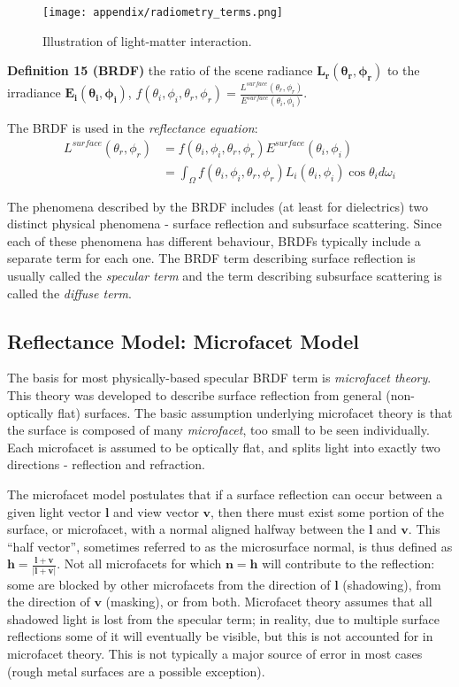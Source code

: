 \begin{figure}[!htbp]
\centering
\texttt{[image: appendix/radiometry\_terms.png]}
\caption{Illustration of light-matter interaction.}
\label{fig:radiometry_terms}
\end{figure}

\noindent\textbf{Definition 15 (BRDF)} the ratio of the scene radiance $\mathbf{L_r(\theta_r, \phi_r)}$ to the irradiance $\mathbf{E_i(\theta_i, \phi_i)}$, \ie $f(\theta_i, \phi_i, \theta_r, \phi_r)=\frac{L^{surface}(\theta_r, \phi_r)}{E^{surface}(\theta_i, \phi_i)}$.

The BRDF is used in the \textit{reflectance equation}:
\begin{align*}
L^{surface}(\theta_r, \phi_r)&=f(\theta_i, \phi_i, \theta_r, \phi_r)E^{surface}(\theta_i, \phi_i)\\
&= \int_\Omega f(\theta_i, \phi_i, \theta_r, \phi_r) L_i(\theta_i, \phi_i) \cos\theta_i d\omega_i
\end{align*}

The phenomena described by the BRDF includes (at least for dielectrics) two distinct physical phenomena - surface reflection and subsurface scattering. Since each of these phenomena has different behaviour, BRDFs typically include a separate term for each one. The BRDF term describing surface reflection is usually called the \textit{specular term} and the term describing subsurface scattering is called the \textit{diffuse term}.

\subsection{Reflectance Model: Microfacet Model}
\label{sec:microfacet_model}
The basis for most physically-based specular BRDF term is \textit{microfacet theory}. This theory was developed to describe surface reflection from general (non-optically flat) surfaces. The basic assumption underlying microfacet theory is that the surface is composed of many \textit{microfacet}, too small to be seen individually. Each microfacet is assumed to be optically flat, and splits light into exactly two directions - reflection and refraction.

The microfacet model postulates that if a surface reflection can occur between a given light vector $\mathbf{l}$ and view vector $\mathbf{v}$, then there must exist some portion of the surface, or microfacet, with a normal aligned halfway between the $\mathbf{l}$ and $\mathbf{v}$. This ``half vector'', sometimes referred to as the microsurface normal, is thus defined as $\mathbf{h}=\frac{\mathbf{l}+\mathbf{v}}{|\mathbf{l}+\mathbf{v}|}$. Not all microfacets for which $\mathbf{n}=\mathbf{h}$ will contribute to the reflection: some are blocked by other microfacets from the direction of $\mathbf{l}$ (shadowing), from the direction of $\mathbf{v}$ (masking), or from both. Microfacet theory assumes that all shadowed light is lost from the specular term; in reality, due to multiple surface reflections some of it will eventually be visible, but this is not accounted for in microfacet theory. This is not typically a major source of error in most cases (rough metal surfaces are a possible exception).

